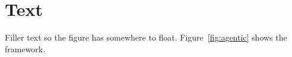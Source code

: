 \documentclass[10pt,twocolumn]{article}
\begin{document}

\section{Text}
Filler text so the figure has somewhere to float. Figure~\ref{fig:agentic} shows the framework.
\end{document}
